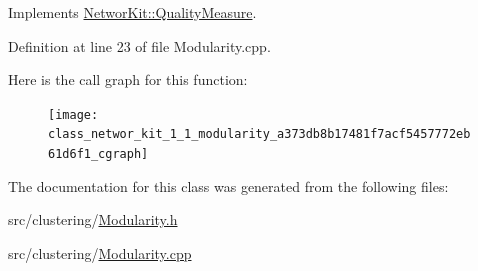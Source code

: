 Implements \hyperlink{class_networ_kit_1_1_quality_measure_af087ed18a264727c7eef24ae45aefe31}{Networ\-Kit\-::\-Quality\-Measure}.



Definition at line 23 of file Modularity.\-cpp.



Here is the call graph for this function\-:
\nopagebreak
\begin{figure}[H]
\begin{center}
\leavevmode
\texttt{[image: class\_networ\_kit\_1\_1\_modularity\_a373db8b17481f7acf5457772eb61d6f1\_cgraph]}
\end{center}
\end{figure}




The documentation for this class was generated from the following files\-:\begin{DoxyCompactItemize}
\item 
src/clustering/\hyperlink{_modularity_8h}{Modularity.\-h}\item 
src/clustering/\hyperlink{_modularity_8cpp}{Modularity.\-cpp}\end{DoxyCompactItemize}
